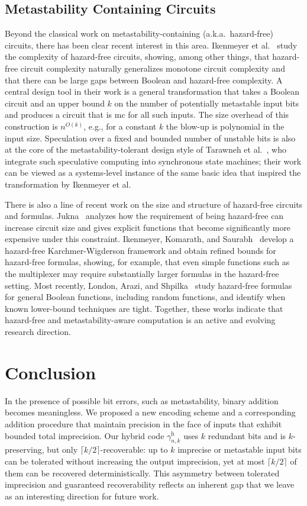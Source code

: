 \documentclass[9pt,journal,compsoc]{IEEEtran}
\theoremstyle{remark}
\newcommand{\gHyb}[1]{\gamma_{#1}^{\operatorname{h}}}
\begin{document}
\subsection*{Metastability Containing Circuits}

Beyond the classical work on metastability-containing (a.k.a.\ hazard-free) circuits, there has
been clear recent interest in this area. Ikenmeyer et al.~\cite{ikenmeyer18complexity} study the
complexity of hazard-free circuits, showing, among other things, that hazard-free circuit complexity naturally generalizes monotone circuit complexity and that there can be large gaps between Boolean and hazard-free complexity. A central design tool in their work is a general transformation that takes a Boolean circuit and an upper bound $k$ on the number of potentially metastable input bits and produces a circuit that is mc for all such inputs. The size overhead of this construction is $n^{O(k)}$, e.g., for a constant $k$ the blow-up is polynomial in the input size. Speculation over a fixed and bounded number of unstable bits is also at the core of the metastability-tolerant design style of Tarawneh et al.~\cite{tarawnehFL17}, who integrate such speculative computing into synchronous state machines; their work can be viewed as a systems-level instance of the same basic idea that inspired
the transformation by Ikenmeyer et al.

There is also a line of recent work on the size and structure of hazard-free circuits and
formulas. Jukna~\cite{jukna21} analyzes how the requirement of being hazard-free can increase circuit size and gives explicit functions that become significantly more expensive under this constraint. Ikenmeyer, Komarath, and Saurabh~\cite{ikenmeyerKS23} develop a hazard-free Karchmer-Wigderson framework and obtain refined bounds for hazard-free formulas, showing,
for example, that even simple functions such as the multiplexer may require substantially
larger formulas in the hazard-free setting. Most recently, London, Arazi, and Shpilka~\cite{DBLP:conf/icalp/AraziS25} study hazard-free formulas for general Boolean functions, including random functions, and identify when known lower-bound techniques are tight. Together, these works
indicate that hazard-free and metastability-aware computation is an active and evolving
research direction.

\section{Conclusion}\label{sec:conclusion}
In the presence of possible bit errors, such as metastability, binary addition becomes meaningless. We proposed a new encoding scheme and a corresponding
addition procedure that maintain precision in the face of inputs that exhibit bounded total imprecision. Our hybrid code $\gHyb{n,k}$ uses $k$ redundant
bits and is $k$-preserving, but only $\lceil k/2\rceil$-recoverable: up to $k$ imprecise or metastable input bits can be tolerated without increasing the
output imprecision, yet at most $\lceil k/2\rceil$ of them can be recovered deterministically. This asymmetry between tolerated imprecision and guaranteed
recoverability reflects an inherent
gap that we leave as an interesting direction for future work.
\end{document}
